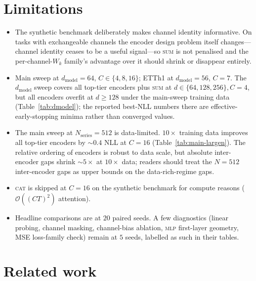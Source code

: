 \documentclass[11pt]{article}
\begin{document}
\section{Limitations}

\begin{itemize}
\item The synthetic benchmark deliberately makes channel identity
      informative. On tasks with exchangeable channels the encoder
      design problem itself changes---channel identity ceases to
      be a useful signal---so \textsc{sum} is not penalised and
      the per-channel-$W_k$ family's advantage over it should
      shrink or disappear entirely.
\item Main sweep at $d_{\text{model}}{=}64$, $C \in \{4,8,16\}$;
      ETTh1 at $d_{\text{model}}{=}56$, $C{=}7$. The $d_{\text{model}}$
      sweep covers all top-tier encoders plus \textsc{sum} at
      $d \in \{64, 128, 256\}, C{=}4$, but all encoders overfit at
      $d \ge 128$ under the main-sweep training data
      (Table~\ref{tab:dmodel}); the reported best-NLL numbers there
      are effective-early-stopping minima rather than converged
      values.
\item The main sweep at $N_{\text{series}}{=}512$ is data-limited.
      $10\times$ training data improves all top-tier encoders by
      ${\sim}0.4$ NLL at $C{=}16$ (Table~\ref{tab:main-largen}).
      The relative ordering of encoders is robust to data scale,
      but absolute inter-encoder gaps shrink ${\sim}5\times$ at
      $10\times$ data; readers should treat the $N{=}512$
      inter-encoder gaps as upper bounds on the data-rich-regime
      gaps.
\item \textsc{cat} is skipped at $C{=}16$ on the synthetic benchmark
      for compute reasons ($\mathcal{O}((CT)^2)$ attention).
\item Headline comparisons are at $20$ paired seeds. A few
      diagnostics (linear probing, channel masking, channel-bias
      ablation, \textsc{mlp} first-layer geometry, MSE loss-family
      check) remain at $5$ seeds, labelled as such in their tables.
\end{itemize}

\section{Related work}
\end{document}
